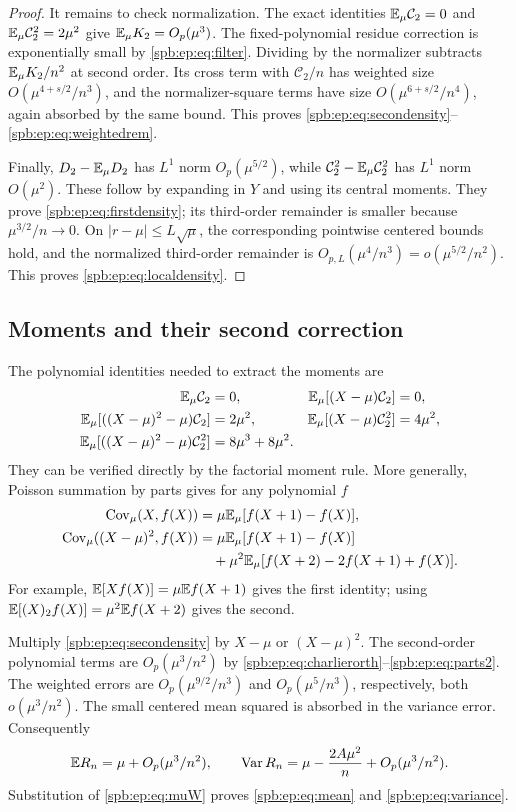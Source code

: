 \begin{proof}
It remains to check normalization. The exact identities
$\mathbb E_\mu\mathcal C_2=0$ and
$\mathbb E_\mu\mathcal C_2^2=2\mu^2$ give
$\mathbb E_\mu K_2=O_p(\mu^3)$.
The fixed-polynomial residue correction is exponentially small by
\eqref{spb:ep:eq:filter}. Dividing by the normalizer subtracts
$\mathbb E_\mu K_2/n^2$ at second order. Its cross term with
$\mathcal C_2/n$ has weighted size
$O(\mu^{4+s/2}/n^3)$, and the normalizer-square terms have size
$O(\mu^{6+s/2}/n^4)$, again absorbed by the same bound.
This proves \eqref{spb:ep:eq:secondensity}--\eqref{spb:ep:eq:weightedrem}.

Finally, $D_2-\mathbb E_\mu D_2$ has $L^1$ norm $O_p(\mu^{5/2})$,
while $\mathcal C_2^2-\mathbb E_\mu\mathcal C_2^2$ has $L^1$ norm
$O(\mu^2)$. These follow by expanding in $Y$ and using its central moments.
They prove \eqref{spb:ep:eq:firstdensity}; its third-order remainder is smaller
because $\mu^{3/2}/n\to0$.
On $|r-\mu|\le L\sqrt\mu$, the corresponding pointwise centered bounds
hold, and the normalized third-order remainder is
$O_{p,L}(\mu^4/n^3)=o(\mu^{5/2}/n^2)$.
This proves \eqref{spb:ep:eq:localdensity}.
\end{proof}

\subsection{Moments and their second correction}
The polynomial identities needed to extract the moments are
\begin{align}
 \mathbb E_\mu\mathcal C_2&=0,&
 \mathbb E_\mu[(X-\mu)\mathcal C_2]&=0,\label{spb:ep:eq:charlierorth}\\
 \mathbb E_\mu[((X-\mu)^2-\mu)\mathcal C_2]&=2\mu^2,&
 \mathbb E_\mu[(X-\mu)\mathcal C_2^2]&=4\mu^2,\nonumber\\
 \mathbb E_\mu[((X-\mu)^2-\mu)\mathcal C_2^2]
        &=8\mu^3+8\mu^2.&&\nonumber
\end{align}
They can be verified directly by the factorial moment rule.
More generally, Poisson summation by parts gives for any polynomial $f$
\begin{align}
 \operatorname{Cov}_\mu(X,f(X))&=\mu\mathbb E_\mu[f(X+1)-f(X)],\label{spb:ep:eq:parts1}\\
 \operatorname{Cov}_\mu((X-\mu)^2,f(X))
  &=\mu\mathbb E_\mu[f(X+1)-f(X)]\nonumber\\
  &\quad+\mu^2\mathbb E_\mu[f(X+2)-2f(X+1)+f(X)].\label{spb:ep:eq:parts2}
\end{align}
For example, $\mathbb E[Xf(X)]=\mu\mathbb E f(X+1)$ gives the first identity;
using $\mathbb E[(X)_2f(X)]=\mu^2\mathbb E f(X+2)$ gives the second.

Multiply \eqref{spb:ep:eq:secondensity} by $X-\mu$ or $(X-\mu)^2$.
The second-order polynomial terms are $O_p(\mu^3/n^2)$ by
\eqref{spb:ep:eq:charlierorth}--\eqref{spb:ep:eq:parts2}.
The weighted errors are $O_p(\mu^{9/2}/n^3)$ and
$O_p(\mu^5/n^3)$, respectively, both $o(\mu^3/n^2)$.
The small centered mean squared is absorbed in the variance error.
Consequently
\begin{equation}\label{spb:ep:eq:meanmu}
 \mathbb E R_n=\mu+O_p(\mu^3/n^2),\qquad
 \operatorname{Var} R_n=\mu-\frac{2A\mu^2}{n}+O_p(\mu^3/n^2).
\end{equation}
Substitution of \eqref{spb:ep:eq:muW} proves \eqref{spb:ep:eq:mean} and
\eqref{spb:ep:eq:variance}.

